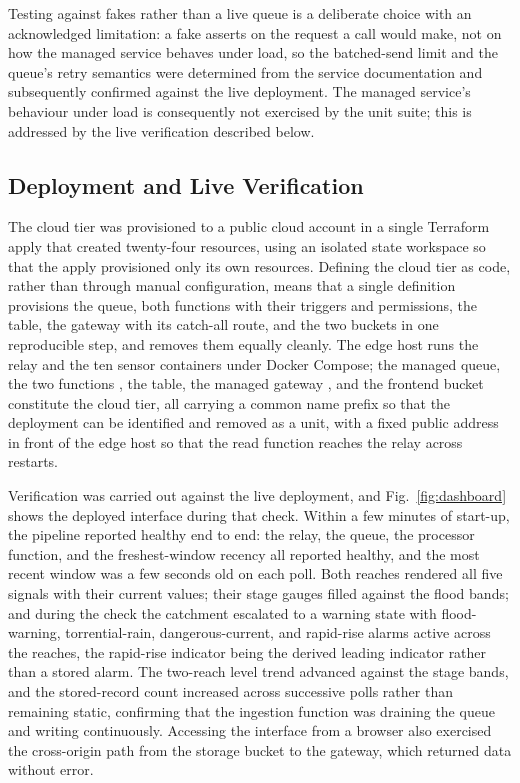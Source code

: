 \documentclass[conference]{IEEEtran}
\begin{document}
Testing against fakes rather than a live queue is a deliberate choice with an acknowledged limitation: a fake asserts on the request a call would make, not on how the managed service behaves under load, so the batched-send limit and the queue's retry semantics were determined from the service documentation \cite{awssqs} and subsequently confirmed against the live deployment. The managed service's behaviour under load is consequently not exercised by the unit suite; this is addressed by the live verification described below.

\subsection{Deployment and Live Verification}

The cloud tier was provisioned to a public cloud account in a single Terraform apply that created twenty-four resources, using an isolated state workspace so that the apply provisioned only its own resources. Defining the cloud tier as code, rather than through manual configuration, means that a single definition provisions the queue, both functions with their triggers and permissions, the table, the gateway with its catch-all route, and the two buckets in one reproducible step, and removes them equally cleanly. The edge host runs the relay and the ten sensor containers under Docker Compose; the managed queue, the two functions \cite{awslambda}, the table, the managed gateway \cite{awsapigw}, and the frontend bucket constitute the cloud tier, all carrying a common name prefix so that the deployment can be identified and removed as a unit, with a fixed public address in front of the edge host so that the read function reaches the relay across restarts.

Verification was carried out against the live deployment, and Fig.~\ref{fig:dashboard} shows the deployed interface during that check. Within a few minutes of start-up, the pipeline reported healthy end to end: the relay, the queue, the processor function, and the freshest-window recency all reported healthy, and the most recent window was a few seconds old on each poll. Both reaches rendered all five signals with their current values; their stage gauges filled against the flood bands; and during the check the catchment escalated to a warning state with flood-warning, torrential-rain, dangerous-current, and rapid-rise alarms active across the reaches, the rapid-rise indicator being the derived leading indicator rather than a stored alarm. The two-reach level trend advanced against the stage bands, and the stored-record count increased across successive polls rather than remaining static, confirming that the ingestion function was draining the queue and writing continuously. Accessing the interface from a browser also exercised the cross-origin path from the storage bucket to the gateway, which returned data without error.
\end{document}
